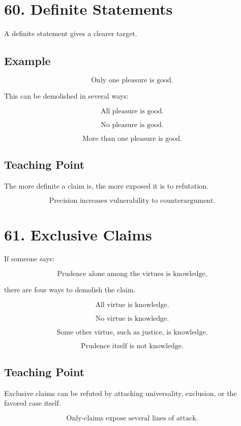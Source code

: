 \documentclass[12pt]{article}
\begin{document}
\section*{60. Definite Statements}

A definite statement gives a clearer target.

\subsection*{Example}

\[
\text{Only one pleasure is good.}
\]

This can be demolished in several ways:

\[
\text{All pleasure is good.}
\]

\[
\text{No pleasure is good.}
\]

\[
\text{More than one pleasure is good.}
\]

\subsection*{Teaching Point}

The more definite a claim is, the more exposed it is to refutation.

\[
\boxed{
\text{Precision increases vulnerability to counterargument.}
}
\]

\section*{61. Exclusive Claims}

If someone says:

\[
\text{Prudence alone among the virtues is knowledge,}
\]

there are four ways to demolish the claim.

\[
\text{All virtue is knowledge.}
\]

\[
\text{No virtue is knowledge.}
\]

\[
\text{Some other virtue, such as justice, is knowledge.}
\]

\[
\text{Prudence itself is not knowledge.}
\]

\subsection*{Teaching Point}

Exclusive claims can be refuted by attacking universality, exclusion, or the
favored case itself.

\[
\boxed{
\text{Only-claims expose several lines of attack.}
}
\]
\end{document}
